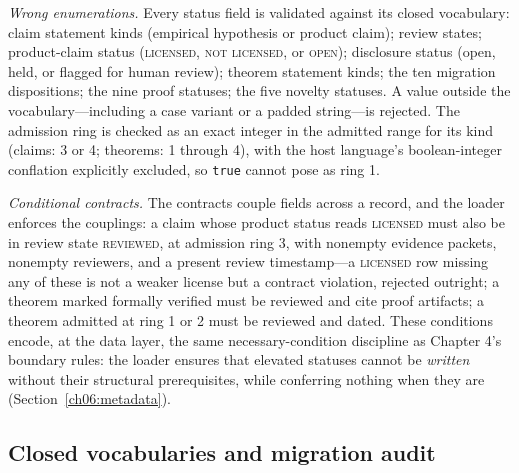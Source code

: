 \emph{Wrong enumerations.} Every status field is validated against its
closed vocabulary: claim statement kinds (empirical hypothesis or product
claim); review states; product-claim status (\textsc{licensed},
\textsc{not licensed}, or \textsc{open}); disclosure status (open, held,
or flagged for human review); theorem statement kinds; the ten migration
dispositions; the nine proof statuses; the five novelty statuses. A value
outside the vocabulary---including a case variant or a padded string---is
rejected. The admission ring is checked as an exact integer in the
admitted range for its kind (claims: 3 or 4; theorems: 1 through 4), with
the host language's boolean-integer conflation explicitly excluded, so
\texttt{true} cannot pose as ring 1.

\emph{Conditional contracts.} The contracts couple fields across a
record, and the loader enforces the couplings: a claim whose product
status reads \textsc{licensed} must also be in review state
\textsc{reviewed}, at admission ring 3, with nonempty evidence packets,
nonempty reviewers, and a present review timestamp---a \textsc{licensed}
row missing any of these is not a weaker license but a contract
violation, rejected outright; a theorem marked formally verified must be
reviewed and cite proof artifacts; a theorem admitted at ring 1 or 2 must
be reviewed and dated. These conditions encode, at the data layer, the
same necessary-condition discipline as Chapter 4's boundary rules: the
loader ensures that elevated statuses cannot be \emph{written} without
their structural prerequisites, while conferring nothing when they are
(Section~\ref{ch06:metadata}).

\subsection{Closed vocabularies and migration audit}

